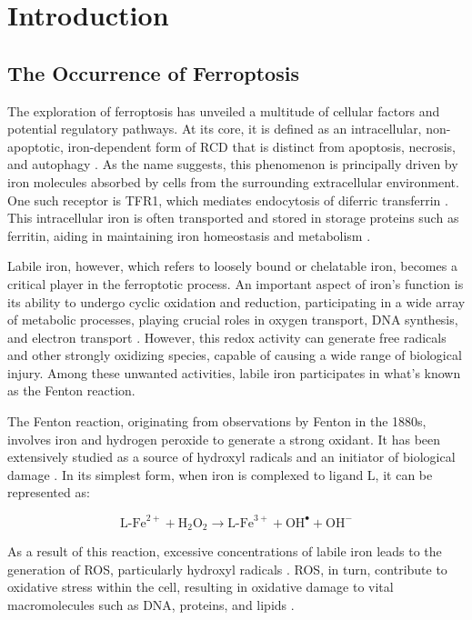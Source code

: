 \chapter[Introduction]%
{Introduction}

\section{The Occurrence of Ferroptosis}

The exploration of ferroptosis has unveiled a multitude of cellular factors and potential regulatory pathways. At its core, it is defined as an intracellular, non-apoptotic, iron-dependent form of \ac{RCD} that is distinct from apoptosis, necrosis, and autophagy \citep{ferro_cd}. As the name suggests, this phenomenon is principally driven by iron molecules absorbed by cells from the surrounding extracellular environment. One such receptor is \ac{TFR1}, which mediates endocytosis of diferric transferrin \citep{tfr1}. This intracellular iron is often transported and stored in storage proteins such as ferritin, aiding in maintaining iron homeostasis and metabolism \citep{ferritin}.

Labile iron, however, which refers to loosely bound or chelatable iron, becomes a critical player in the ferroptotic process. An important aspect of iron's function is its ability to undergo cyclic oxidation and reduction, participating in a wide array of metabolic processes, playing crucial roles in oxygen transport, DNA synthesis, and electron transport \citep{iron_importance}. However, this redox activity can generate free radicals and other strongly oxidizing species, capable of causing a wide range of biological injury. Among these unwanted activities, labile iron participates in what's known as the Fenton reaction.

The Fenton reaction, originating from observations by Fenton in the 1880s, involves iron and hydrogen peroxide to generate a strong oxidant. It has been extensively studied as a source of hydroxyl radicals and an initiator of biological damage \citep{fenton2}. In its simplest form, when iron is complexed to ligand L, it can be represented as:

\[
\text{L-Fe}^{2+} + \text{H}_2\text{O}_2 \rightarrow \text{L-Fe}^{3+} + \text{OH}^• + \text{OH}^-
\]

As a result of this reaction, excessive concentrations of labile iron leads to the generation of \ac{ROS}, particularly hydroxyl radicals \citep{labile_iron}. \ac{ROS}, in turn, contribute to oxidative stress within the cell, resulting in oxidative damage to vital macromolecules such as DNA, proteins, and lipids \citep{oxidative_stress}. 

